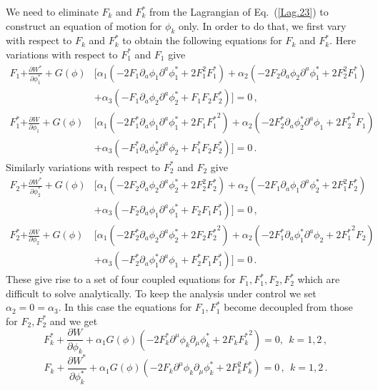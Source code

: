 \documentclass[a4paper,11pt]{article}
\def\non{\nonumber\\}
\def\non{\nonumber\\}
\begin{document}
	We need to eliminate $F_k$ and $F^*_k$ from the Lagrangian of Eq.~(\ref{Lag.23})
	to construct an equation of motion for $\phi_k$ only. In order to do that, we first vary with respect to $F_k$ and $F^*_k$ to obtain the following equations for $F_k$ and $F^*_k$. Here variations with respect to $F^*_1$ and $F_1$ give
	\begin{align}
		F_1 {+ \frac{\partial W^*}{\partial \phi_1^*}} + G(\phi) &\Big[
			   \alpha_1( -2 F_1 \partial_a\phi_1 \partial^a \phi_1^* + 2 F_1^2 F^*_1)
		     + \alpha_2( -2 F_2 \partial_a\phi_2 \partial^a \phi_1^* + 2F_2^2 F^*_1) \non
			&{+ \alpha_3( - F_1 \partial_a\phi_2 \partial^a \phi_2^* + F_1F_2 F^*_2)
		\Big] = 0\,,}\non
		F^*_1 {+ \frac{\partial W}{\partial \phi_1}} + G(\phi) &\Big[
			   \alpha_1( -2 F^*_1 \partial_a\phi_1 \partial^a \phi_1^* + 2 F_1 {F^*_1}^2)
			 + \alpha_2( -2 F^*_2 \partial_a\phi^*_2 \partial^a \phi_1 + 2{F^*_2}^2 F_1) \non
			&{+ \alpha_3( - F^*_1  \partial_a\phi^*_2 \partial^a \phi_2 + F^*_1F_2 F^*_2)
		\Big] = 0\,.}
	\end{align}
	Similarly variations with respect to $F^*_2$ and $F_2$ give
	\begin{align}
		F_2 {+ \frac{\partial W^*}{\partial \phi_2^*}} + G(\phi) &\Big[
			   \alpha_1(- 2 F_2 \partial_a \phi_2 \partial^a \phi_2^* + 2 F_2^2 F^*_2)
			 + \alpha_2(- 2 F_1 \partial_a \phi_1 \partial^a \phi_2^* + 2 F_1^2 F^*_2) \non
			&{+ \alpha_3(-   F_2 \partial_a \phi_1 \partial^a \phi_1^* + F_2 F_1 F^*_1)
		\Big] = 0\,,} \non
		F^*_2 {+ \frac{\partial W}{\partial \phi_2}} + G(\phi) &\Big[
			   \alpha_1(- 2 F^*_2 \partial_a \phi_2 \partial^a \phi_2^* + 2 F_2 {F^*_2}^2)
			 + \alpha_2(- 2 F^*_1 \partial_a \phi^*_1 \partial^a \phi_2 + 2 {F^*_1}^2 F_2) \non
			&{+ \alpha_3(-   F^*_2 \partial_a \phi^*_1 \partial^a \phi_1 + F^*_2 F_1 F^*_1)
		\Big] = 0\,.}
	\end{align}
	These give rise to a set of four coupled equations for $F_1, F^*_1, F_2, F^*_2$ which are difficult to solve analytically.
	To keep the analysis under control we set $\alpha_2=0=\alpha_3$. In this case the equations for
	$F_1, F^*_1$ become decoupled from those for $F_2, F^*_2$ and we get
	\begin{equation}
		{F^*_k}+\frac{\partial W}{\partial \phi_k}+\alpha_1G\left(\phi \right)\left(-2{F^*_k}\partial^\mu \phi_k \partial_\mu {\phi^*_k}+2F_k{{F^*_k}}^2\right)=0, ~~k=1,2\,,
		\label{barFk}
	\end{equation}
	\begin{equation}
		F_k+\frac{\partial W^*}{\partial {\phi^*_k}}+\alpha_1G\left(\phi \right)\left(-2F_k\partial^\mu \phi_k \partial_\mu {\phi^*_k}+2F_k^2{F^*_k}\right)=0\,, ~~k=1,2\,.
		\label{Fk}
	\end{equation}
\end{document}

